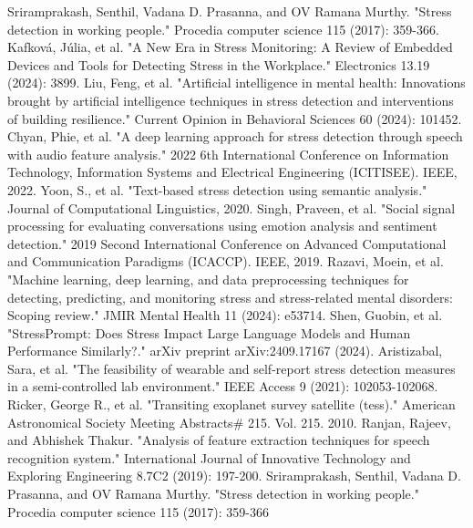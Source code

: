 \documentclass[a4j, twocolumn]{article}
\begin{document}
\begin{enumerate}
Sriramprakash, Senthil, Vadana D. Prasanna, and OV Ramana Murthy. "Stress detection in working people." Procedia computer science 115 (2017): 359-366.
  Kafková, Júlia, et al. "A New Era in Stress Monitoring: A Review of Embedded Devices and Tools for Detecting Stress in the Workplace." Electronics 13.19 (2024): 3899.
 Liu, Feng, et al. "Artificial intelligence in mental health: Innovations brought by artificial intelligence techniques in stress detection and interventions of building resilience." Current Opinion in Behavioral Sciences 60 (2024): 101452.
 Chyan, Phie, et al. "A deep learning approach for stress detection through speech with audio feature analysis." 2022 6th International Conference on Information Technology, Information Systems and Electrical Engineering (ICITISEE). IEEE, 2022.
 Yoon, S., et al. "Text-based stress detection using semantic analysis." Journal of Computational Linguistics, 2020.
 Singh, Praveen, et al. "Social signal processing for evaluating conversations using emotion analysis and sentiment detection." 2019 Second International Conference on Advanced Computational and Communication Paradigms (ICACCP). IEEE, 2019.
 Razavi, Moein, et al. "Machine learning, deep learning, and data preprocessing techniques for detecting, predicting, and monitoring stress and stress-related mental disorders: Scoping review." JMIR Mental Health 11 (2024): e53714.
 Shen, Guobin, et al. "StressPrompt: Does Stress Impact Large Language Models and Human Performance Similarly?." arXiv preprint arXiv:2409.17167 (2024).
 Aristizabal, Sara, et al. "The feasibility of wearable and self-report stress detection measures in a semi-controlled lab environment." IEEE Access 9 (2021): 102053-102068.  %
 Ricker, George R., et al. "Transiting exoplanet survey satellite (tess)." American Astronomical Society Meeting Abstracts\# 215. Vol. 215. 2010. %
 Ranjan, Rajeev, and Abhishek Thakur. "Analysis of feature extraction techniques for speech recognition system." International Journal of Innovative Technology and Exploring Engineering 8.7C2 (2019): 197-200. %
Sriramprakash, Senthil, Vadana D. Prasanna, and OV Ramana Murthy. "Stress detection in working people." Procedia computer science 115 (2017): 359-366


\end{enumerate}
\end{document}
